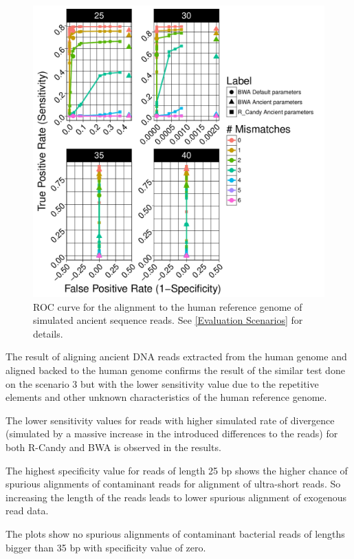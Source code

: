 \documentclass[11pt,a4paper]{report}
\begin{document}
\begin{figure}[H]
\centering
\includegraphics[width=12cm]{pictures/bROC_DS4_emp.pdf}


\caption{
ROC curve for the alignment to the human reference genome of simulated ancient
sequence reads. See \ref{Evaluation Scenarios} for details.
}

\label{DS4_emp}
\end{figure}



The result of aligning ancient DNA reads extracted from the human genome
and aligned backed to the human genome confirms the result of the similar
test done on the scenario 3 but with the lower sensitivity value due to 
the repetitive elements and other unknown characteristics of the human 
reference genome.

The lower sensitivity values for reads with higher simulated rate of 
divergence (simulated by a massive increase in the introduced differences
to the reads) for both R-Candy and BWA is observed in the results.

The highest specificity value for reads of length 25 bp shows the higher 
chance of spurious alignments of contaminant reads for alignment of 
ultra-short reads.
So increasing the length of the reads leads to lower spurious alignment 
of  exogenous read data.

The plots show no spurious alignments of  contaminant bacterial reads of 
lengths bigger than 35 bp with specificity value of zero.
\end{document}
